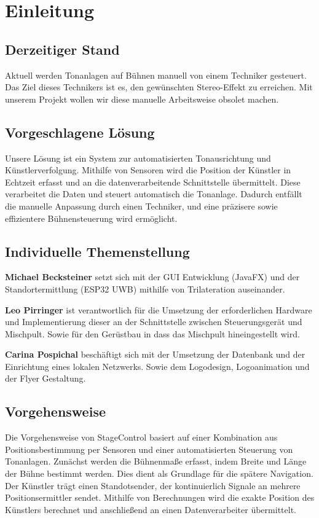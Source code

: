 \chapter{Einleitung}
\section{Derzeitiger Stand}
Aktuell werden Tonanlagen auf Bühnen manuell von einem Techniker gesteuert. Das Ziel dieses Technikers ist es, den gewünschten Stereo-Effekt zu erreichen. Mit unserem Projekt wollen wir diese manuelle Arbeitsweise obsolet machen.

\section{Vorgeschlagene Lösung}
Unsere Lösung ist ein System zur automatisierten Tonausrichtung und Künstlerverfolgung. Mithilfe von Sensoren wird die Position der Künstler in Echtzeit erfasst und an die datenverarbeitende Schnittstelle übermittelt. Diese verarbeitet die Daten und steuert automatisch die Tonanlage. Dadurch entfällt die manuelle Anpassung durch einen Techniker, und eine präzisere sowie effizientere Bühnensteuerung wird ermöglicht.

\section{Individuelle Themenstellung}
\textbf{Michael Becksteiner} setzt sich mit der GUI Entwicklung (JavaFX) und der Standortermittlung (ESP32 UWB) mithilfe von Trilateration auseinander. 

\textbf{Leo Pirringer} ist verantwortlich für die Umsetzung der erforderlichen Hardware und Implementierung dieser an der Schnittstelle zwischen Steuerungsgerät und Mischpult. Sowie für den Gerüstbau in dass das Mischpult hineingestellt wird.

\textbf{Carina Pospichal} beschäftigt sich mit der Umsetzung der Datenbank und der Einrichtung eines lokalen Netzwerks. Sowie dem Logodesign, Logoanimation und der Flyer Gestaltung. 

\section{Vorgehensweise} 
Die Vorgehensweise von StageControl basiert auf einer Kombination aus Positionsbestimmung per Sensoren und einer automatisierten Steuerung von Tonanlagen. Zunächst werden die Bühnenmaße erfasst, indem Breite und Länge der Bühne bestimmt werden. Dies dient als Grundlage für die spätere Navigation. Der Künstler trägt einen Standotsender, der kontinuierlich Signale an mehrere Positionsermittler sendet. Mithilfe von Berechnungen wird die exakte Position des Künstlers berechnet und anschließend an einen Datenverarbeiter übermittelt.  

